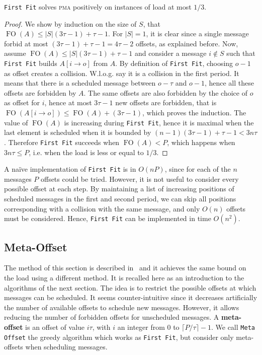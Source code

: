 \documentclass[a4paper,UKenglish,cleveref, autoref, thm-restate]{lipics-v2019}
\DeclareMathOperator{\Fo}{FO}
\newcommand\pma{\textsc{pma}\xspace}
\newcommand\firstfit{\texttt{First Fit}\xspace}
\newcommand\metaoffset{\texttt{Meta Offset}\xspace}
\begin{document}
\begin{theorem}
\firstfit solves \pma positively on instances of load at most $1/3$. 
\end{theorem}
\begin{proof}
We show by induction on the size of $S$, that $\Fo(A) \leq |S|(3\tau -1) + \tau - 1$. For $|S| = 1$, it is clear since a single message forbid at most $(3\tau -1) + \tau -1 = 4\tau-2$ offsets, as explained before. Now, assume $\Fo(A) \leq |S|(3\tau -1) + \tau -1$ and consider a message $i \notin S$ such that \firstfit builds $A[i \rightarrow o]$ from $A$. By definition of \firstfit, choosing $o-1$ as offset creates a collision. W.l.o.g. say it is a collision in the first period. It means that there is a scheduled message between $o - \tau $ and $o-1$, hence all these offsets are forbidden by $A$. The same offsets are also forbidden by the choice of $o$ as offset for $i$, hence at most $3\tau -1$ new offsets are forbidden, that is $\Fo(A[i \rightarrow o]) \leq \Fo(A) + (3\tau -1)$, which proves the induction. 
The value of $\Fo(A)$ is increasing during \firstfit, hence it is maximal when the last element is scheduled when it is bounded by $(n-1)(3\tau -1) + \tau - 1 < 3n\tau$.
Therefore \firstfit succeeds when $\Fo(A) < P$, which happens when $3n\tau \leq P$, i.e. when the load is less or equal to $1/3$.
\end{proof}


A naïve implementation of \firstfit is in $O(nP)$, since for each of the $n$ messages $P$ offsets could be tried.
However, it is not useful to consider every possible offset at each step. By maintaining a list of increasing positions of scheduled messages in the first and second period, 
we can skip all positions corresponding with a collision with the same message, and only $O(n)$ offsets must be considered. Hence, \firstfit can be implemented in time $O(n^2)$.

\subsection{Meta-Offset}

The method of this section is described in~\cite{bartharxiv2018deterministic} and it achieves the same bound on the load using a different method. It is recalled here as an introduction to the algorithms of the next section.
The idea is to restrict the possible offsets at which messages can be scheduled. It seems counter-intuitive since it decreases artificially the number of available offsets to schedule new messages. However, it allows reducing the number of forbidden offsets for unscheduled messages. A \textbf{meta-offset} is an offset of value $i\tau$,
with $i$ an integer from $0$ to $\lceil P / \tau \rceil - 1$. We call \metaoffset the greedy algorithm which works as \firstfit, but consider only meta-offsets when scheduling messages. 
\end{document}
